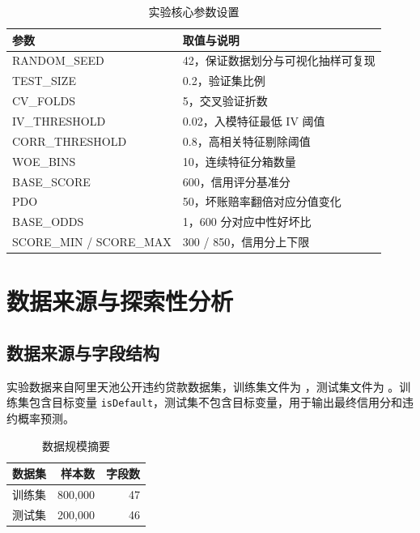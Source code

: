 \documentclass[UTF8,a4paper,12pt]{ctexart}
\begin{document}
\begin{table}[H]
    \centering
    \caption{实验核心参数设置}
    \label{tab:params}
    \begin{tabular}{ll}
        \toprule
        参数 & 取值与说明 \\
        \midrule
        RANDOM\_SEED & 42，保证数据划分与可视化抽样可复现 \\
        TEST\_SIZE & 0.2，验证集比例 \\
        CV\_FOLDS & 5，交叉验证折数 \\
        IV\_THRESHOLD & 0.02，入模特征最低 IV 阈值 \\
        CORR\_THRESHOLD & 0.8，高相关特征剔除阈值 \\
        WOE\_BINS & 10，连续特征分箱数量 \\
        BASE\_SCORE & 600，信用评分基准分 \\
        PDO & 50，坏账赔率翻倍对应分值变化 \\
        BASE\_ODDS & 1，600 分对应中性好坏比 \\
        SCORE\_MIN / SCORE\_MAX & 300 / 850，信用分上下限 \\
        \bottomrule
    \end{tabular}
\end{table}

\section{数据来源与探索性分析}

\subsection{数据来源与字段结构}

实验数据来自阿里天池公开违约贷款数据集，训练集文件为 ，测试集文件为 。训练集包含目标变量 \texttt{isDefault}，测试集不包含目标变量，用于输出最终信用分和违约概率预测。

\begin{table}[H]
    \centering
    \caption{数据规模摘要}
    \label{tab:data-scale}
    \begin{tabular}{lrr}
        \toprule
        数据集 & 样本数 & 字段数 \\
        \midrule
        训练集 & 800,000 & 47 \\
        测试集 & 200,000 & 46 \\
        \bottomrule
    \end{tabular}
\end{table}
\end{document}
